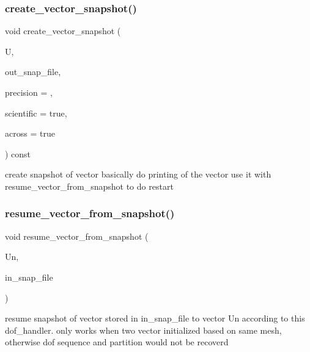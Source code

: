 \subsubsection{\texorpdfstring{create\_vector\_snapshot()}{create\_vector\_snapshot()}}
{\footnotesize\ttfamily void create\+\_\+vector\+\_\+snapshot (\begin{DoxyParamCaption}\item[{vector\+Type \&}]{U,  }\item[{std\+::string}]{out\+\_\+snap\+\_\+file,  }\item[{unsigned int}]{precision = {},  }\item[{const bool}]{scientific = {\ttfamily true},  }\item[{const bool}]{across = {\ttfamily true} }\end{DoxyParamCaption}) const}

create snapshot of vector basically do printing of the vector use it with resume\+\_\+vector\+\_\+from\+\_\+snapshot to do restart \mbox{\label{class_f_e_mdata_a2611613e158345b619062316e281c4c9}} 
\subsubsection{\texorpdfstring{resume\_vector\_from\_snapshot()}{resume\_vector\_from\_snapshot()}}
{\footnotesize\ttfamily void resume\+\_\+vector\+\_\+from\+\_\+snapshot (\begin{DoxyParamCaption}\item[{vector\+Type \&}]{Un,  }\item[{std\+::string}]{in\+\_\+snap\+\_\+file }\end{DoxyParamCaption})}

resume snapshot of vector stored in \textquotesingle{}in\+\_\+snap\+\_\+file\textquotesingle{} to vector \textquotesingle{}Un\textquotesingle{} according to this dof\+\_\+handler. only works when two vector initialized based on same mesh, otherwise dof sequence and partition would not be recoverd \mbox{\label{class_f_e_mdata_a770f8539c16d21624bcedc1f6bee9d68}} 
